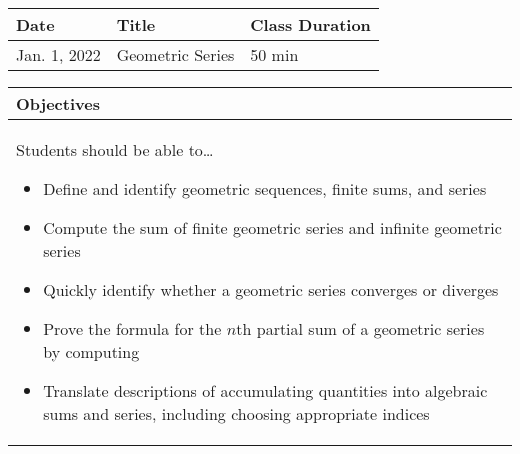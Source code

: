 \documentclass{book}
\begin{document}
		\begin{tabularx}{\textwidth}{|s|X|s|}
			\hline
			Date & Title & Class Duration\\
			\hline
			Jan. 1, 2022& Geometric Series & 50 min\\
			\hline
		\end{tabularx}
		
		\begin{tabularx}{\textwidth}{|X|}
			\hline
			Objectives\\
			\hline
			Students should be able to\ldots
			\begin{itemize}
				\item Define and identify geometric sequences, finite sums, and series
				\item Compute the sum of finite geometric series and infinite geometric
				series
				\item Quickly identify whether a geometric series converges or diverges
				\item Prove the formula for the $n$th partial sum of a geometric series by
				computing
				\item Translate descriptions of accumulating quantities into algebraic sums
				and series, including choosing appropriate indices
			\end{itemize}\\
			\hline
		\end{tabularx}
		
\end{document}

